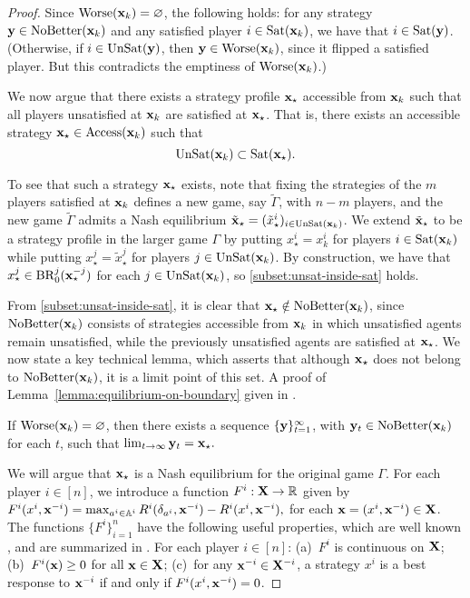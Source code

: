 \begin{proof}
Since ${\rm Worse}({\mathbf{x}}_k) = \varnothing $, the following holds: for any strategy ${\mathbf{y}} \in {\rm NoBetter}({\mathbf{x}}_k)$ and any satisfied player $i \in {\rm Sat} ({\mathbf{x}}_k)$, we have that $i \in {\rm Sat}({\mathbf{y}})$. (Otherwise, if $i \in {\rm UnSat}({\mathbf{y}})$, then ${\mathbf{y}} \in {\rm Worse}({\mathbf{x}}_k) $, since it flipped a satisfied player. But this contradicts the emptiness of ${\rm Worse}({\mathbf{x}}_k)$.)


We now argue that there exists a strategy profile ${\mathbf{x}}_{\star}$ accessible from ${\mathbf{x}}_k$ such that all players unsatisfied at ${\mathbf{x}}_k$ are satisfied at ${\mathbf{x}}_{\star}$. That is, there exists an accessible strategy ${\mathbf{x}}_{\star} \in {\rm Access} ( {\mathbf{x}}_k )$ such that 
\begin{equation} 
{\rm UnSat}({\mathbf{x}}_k) \subset {\rm Sat}({\mathbf{x}}_{\star}).  \label{subset:unsat-inside-sat}
\end{equation}

To see that such a strategy ${\mathbf{x}}_{\star}$ exists, note that fixing the strategies of the $m$ players satisfied at ${\mathbf{x}}_k$ defines a new game, say $\tilde{\Gamma}$, with $n-m$ players, and the new game $\tilde{\Gamma}$ admits a Nash equilibrium $\tilde{{\mathbf{x}}}_{\star} = ( \tilde{x}^i_{\star} )_{i \in {\rm UnSat}({\mathbf{x}}_k )}$. We extend $\tilde{{\mathbf{x}}}_{\star}$ to be a strategy profile in the larger game $\Gamma$ by putting $x^i_{\star} = x^i_k$ for players $i \in {\rm Sat}({\mathbf{x}}_k)$ while putting $x^j_{\star} = \tilde{x}^j_{\star}$ for players $j \in {\rm UnSat}({\mathbf{x}}_k)$. By construction, we have that $x^{j}_{\star} \in {\rm BR}^j_0 ( {\mathbf{x}}^{-j}_{\star})$ for each $j \in {\rm UnSat}({\mathbf{x}}_k)$, so \eqref{subset:unsat-inside-sat} holds.

From \eqref{subset:unsat-inside-sat}, it is clear that ${\mathbf{x}}_{\star} \notin {\rm NoBetter}({\mathbf{x}}_k)$, since ${\rm NoBetter}({\mathbf{x}}_k)$ consists of strategies accessible from ${\mathbf{x}}_k$ in which unsatisfied agents remain unsatisfied, while the previously unsatisfied agents are satisfied at ${\mathbf{x}}_{\star}$. 
We now state a key technical lemma, which asserts that although ${\mathbf{x}}_{\star}$ does not belong to ${\rm NoBetter}({\mathbf{x}}_k)$, it is a limit point of this set. A proof of Lemma~\ref{lemma:equilibrium-on-boundary} given in .

\begin{lemma} \label{lemma:equilibrium-on-boundary}
    If ${\rm Worse}( {\mathbf{x}}_k ) = \varnothing$, then there exists a sequence $\{ {\mathbf{y}} \}_{t = 1}^{\infty}$, with ${\mathbf{y}}_t \in {\rm NoBetter}({\mathbf{x}}_k)$ for each $t$, such that $     \lim_{t \to \infty} {\mathbf{y}}_t = {\mathbf{x}}_{\star}. $  
\end{lemma}

We will argue that ${\mathbf{x}}_{\star}$ is a Nash equilibrium for the original game $\Gamma$. For each player $i \in [n]$, we introduce a function $F^i : {\mathbf{X}} \to \mathbb{R}$ given by $F^i ( x^i, {\mathbf{x}}^{-i} ) = \max_{a^i \in \mathbb{A}^i} R^i ( \delta_{a^i} , {\mathbf{x}}^{-i} ) - R^i ( x^i, {\mathbf{x}}^{-i} ),$ for each ${\mathbf{x}} = (x^i, {\mathbf{x}}^{-i}) \in {\mathbf{X}}$. The functions $\{ F^i\}_{i=1}^n$ have the following useful properties, which are well known \cite{maschler2020game}, and are summarized in . For each player $i \in [n]$: (a)~$F^i$ is continuous on ${\mathbf{X}}$; (b)~$F^i ({\mathbf{x}}) \geq 0$ for all ${\mathbf{x}} \in {\mathbf{X}}$; (c)~for any ${\mathbf{x}}^{-i} \in {\mathbf{X}}^{-i}$, a strategy $x^i$ is a best response to ${\mathbf{x}}^{-i}$ if and only if $F^i (x^i, {\mathbf{x}}^{-i}) = 0$.


\end{proof}
